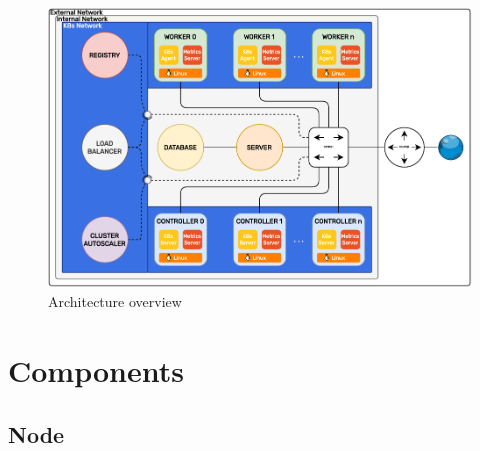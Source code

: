 \begin{figure}[htbp]
  \centering
  \includegraphics[width=.9\textwidth]{images/architecture/architecture.pdf}
  \caption{Architecture overview}
  \label{fig:architecture}
\end{figure}

\section{Components}
\label{sec:architecture_components}

\subsection{Node}
\label{subsec:architecture_components_node}

